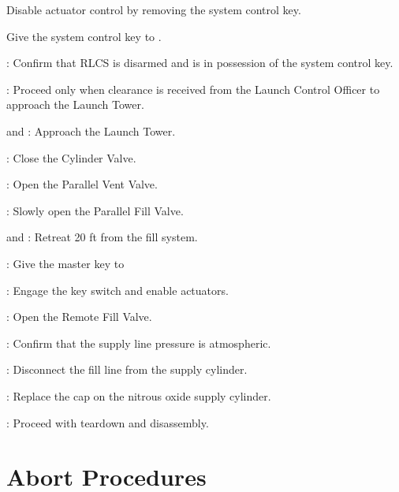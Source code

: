 \begin{checklist}
\begin{checklist}
        \item Disable actuator control by removing the system control key.
        \item Give the system control  key to \ops{}.
    \end{checklist}
    \item \ops: Confirm that RLCS is disarmed and \ops{} is in possession of the system control  key.
    \item \ops{}: Proceed only when clearance is received from the Launch Control Officer to approach the Launch Tower.
    \item \primary{} and \secondary: Approach the Launch Tower.
    \item \primary{}: Close the Cylinder Valve.
    \item \primary{}: Open the Parallel Vent Valve.
    \item \primary{}: Slowly open the Parallel Fill Valve.
    \item \primary{} and \secondary: Retreat 20 ft from the fill system.
    \item \ops: Give the master key to \control{}
    \item \control{}: Engage the key switch and enable actuators.
    \item \control{}: Open the Remote Fill Valve.
    \item \control{}: Confirm that the supply line pressure is atmospheric.
    \item \primary{}: Disconnect the fill line from the supply cylinder.
    \item \primary{}: Replace the cap on the nitrous oxide supply cylinder.
    \item \ops{}: Proceed with teardown and disassembly.
\end{checklist}
\setcounter{checklistnum}{0}

\newpage
    
\section{Abort Procedures} 
